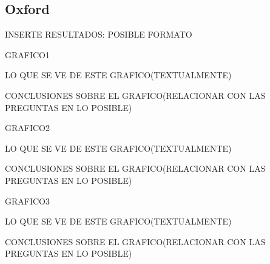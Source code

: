\subsection{Oxford}


INSERTE RESULTADOS: POSIBLE FORMATO

GRAFICO1

LO QUE SE VE DE ESTE GRAFICO(TEXTUALMENTE)

CONCLUSIONES SOBRE EL GRAFICO(RELACIONAR CON LAS PREGUNTAS EN LO POSIBLE)


GRAFICO2

LO QUE SE VE DE ESTE GRAFICO(TEXTUALMENTE)

CONCLUSIONES SOBRE EL GRAFICO(RELACIONAR CON LAS PREGUNTAS EN LO POSIBLE)


GRAFICO3

LO QUE SE VE DE ESTE GRAFICO(TEXTUALMENTE)

CONCLUSIONES SOBRE EL GRAFICO(RELACIONAR CON LAS PREGUNTAS EN LO POSIBLE)